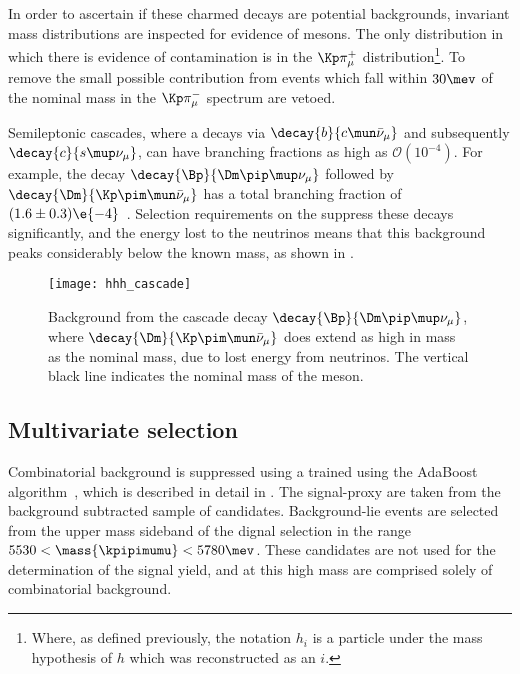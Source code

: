 In order to ascertain if these charmed decays are potential backgrounds, invariant mass
distributions are inspected for evidence of \Dz mesons.
The only distribution in which there is evidence of contamination is in the
$\Kp\pi^+_\mu$ distribution\footnote{
  Where, as defined previously, the notation $h_i$ is a particle under the mass hypothesis of $h$
  which was reconstructed as an $i$.
}.
To remove the small possible contribution from \decay{\Bd}{\Dzb\pip\pipi} events which fall within
$30\mev$ of the nominal \Dz mass in the $\Kp\pi^-_\mu$ spectrum are vetoed.



Semileptonic cascades, where a \bquark decays via $\decay{b}{c\mun\bar\nu_\mu}$ and subsequently
$\decay{c}{s\mup\nu_\mu}$, can have branching fractions as high as $\mathcal{O}(10^{-4})$.
For example, the decay $\decay{\Bp}{\Dm\pip\mup\nu_\mu}$ followed by
$\decay{\Dm}{\Kp\pim\mun\bar\nu_\mu}$ has a total branching fraction of
$(1.6\pm0.3)\e{-4}$~\cite{PDG2014}.
Selection requirements on the \chisqvtx suppress these decays significantly, and the energy lost to
the neutrinos means that this background peaks considerably below the known \Bp mass, as shown in
.

\begin{figure}
  \begin{center}
    \texttt{[image: hhh\_cascade]}
    \caption[Simulated background from cascade decays]
    {
      Background from the cascade decay $\decay{\Bp}{\Dm\pip\mup\nu_\mu}$, where
      $\decay{\Dm}{\Kp\pim\mun\bar\nu_\mu}$ does extend as high in mass as the nominal \Bp mass,
      due to lost energy from neutrinos.
      The vertical black line indicates the nominal mass of the \Bp meson.
    }
    \label{fig:hhh:cascade}
  \end{center}
\end{figure}


\subsection{Multivariate selection}
\label{sec:hhh:bdt}
Combinatorial background is suppressed using a \BDT trained using the AdaBoost
algorithm~\cite{AdaBoost}, which is described in detail in .
The signal-proxy are taken from the background subtracted sample of \btojpsikpipi candidates.
Background-lie events are selected from the upper mass sideband of the dignal selection in the
range $5530<\mass{\kpipimumu}<5780\mev$.
These candidates are not used for the determination of the signal yield, and at this high mass are
comprised solely of combinatorial background.

